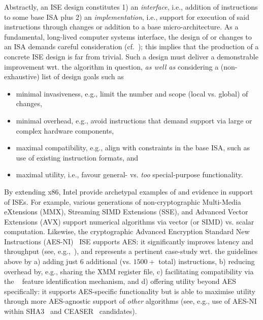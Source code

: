 Abstractly, an ISE design constitutes
1) an {\em interface},
   i.e., 
   addition of instructions to some 
   base ISA
   plus
2) an {\em implementation},
   i.e., 
   support for execution of said instructions through changes or addition 
   to a 
   base micro-architecture.
As a fundamental, long-lived computer systems interface, the design of or
changes to an ISA demands careful consideration
(cf.~\cite[Section 4]{Gueron:09}); this implies that the production of a 
concrete ISE design is far from trivial.  
Such a design must deliver a demonstrable improvement wrt. the algorithm in 
question, {\em as well as} considering a (non-exhaustive) list of design 
goals such as

\begin{itemize}
\item minimal invasiveness,
      e.g.,
      limit the number and scope (local vs. global) of changes,
\item minimal overhead,
      e.g.,
      avoid instructions that demand support via large or complex hardware components,
\item maximal compatibility,
      e.g.,
      align with constraints in the base ISA, such as use of existing instruction formats,
      and
\item maximal       utility,
      i.e.,
      favour general- vs. {\em too} special-purpose functionality.
\end{itemize}

\noindent
By extending x86, Intel provide archetypal examples of and evidence in
support of ISEs.
For example, various generations of
non-cryptographic
Multi-Media      eXtensions (MMX),
Streaming SIMD  Extensions (SSE),
and
Advanced Vector Extensions (AVX)
support numerical algorithms via vector (or SIMD) vs. scalar computation.  
Likewise, the
    cryptographic
Advanced Encryption Standard New Instructions (AES-NI)~\cite{Gueron:09,DruGueKra:19}
ISE
supports AES: it significantly improves latency and throughput
(see, e.g.,~\cite{FazLopOli:18}),
and represents a pertinent case-study wrt. the guidelines above by
a) adding just $6$ additional (vs. $1500+$ total) instructions,
b) reducing overhead by, e.g., sharing the XMM register file,
c) facilitating compatibility via the
   ~\cite[Chapter 20]{X86:1:18}
   feature identification mechanism,
   and
d) offering utility beyond AES specifically:
   it supports AES-specific functionality but is able to maximise utility 
   through more AES-agnostic support of {\em other} algorithms
   (see, e.g., use of AES-NI within SHA3~\cite{BBGR:09} and CEASER~\cite[Section 4.1]{AnkAnk:16} candidates).


